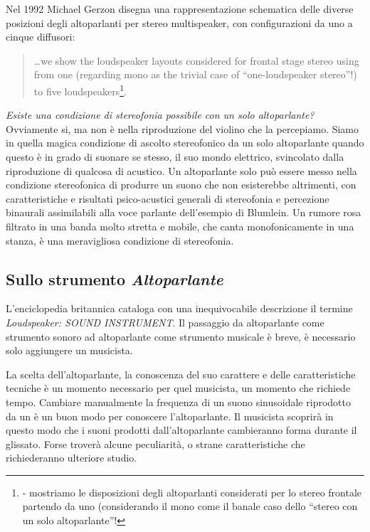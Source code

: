 Nel 1992 Michael Gerzon disegna una rappresentazione schematica delle diverse
posizioni degli altoparlanti per stereo multispeaker, con configurazioni da uno
a cinque diffusori:

\begin{quote}
\ldots we show the loudspeaker layouts considered for frontal stage stereo
using from one (regarding mono as the trivial case of “one-loudspeaker stereo”!)
to five loudspeakers\footnote{\cite{mg92pdmsss} - mostriamo le disposizioni
degli altoparlanti considerati per lo stereo frontale partendo da uno
(considerando il mono come il banale caso dello “stereo con un solo altoparlante”!}.
\end{quote}

\emph{Esiste una condizione di stereofonia possibile con un solo altoparlante?}
Ovviamente si, ma non è nella riproduzione del violino che la percepiamo. Siamo
in quella magica condizione di ascolto stereofonico da un solo altoparlante
quando questo è in grado di suonare se stesso, il suo mondo elettrico, svincolato
dalla riproduzione di qualcosa di acustico. Un altoparlante solo può essere
messo nella condizione stereofonica di produrre un suono che non esisterebbe
altrimenti, con caratteristiche e risultati psico-acustici generali di stereofonia
e percezione binaurali assimilabili alla voce parlante dell'esempio di Blumlein.
Un rumore rosa filtrato in una banda molto stretta e mobile, che canta
monofonicamente in una stanza, è una meravigliosa condizione di stereofonia.

\subsection{Sullo strumento \emph{Altoparlante}}

L'enciclopedia britannica cataloga con una inequivocabile descrizione il termine
\emph{Loudspeaker: SOUND INSTRUMENT}. Il passaggio da altoparlante come strumento
sonoro ad altoparlante come strumento musicale è breve, è necessario solo
aggiungere un musicista.

La scelta dell'altoparlante, la conoscenza del suo carattere e delle caratteristiche
tecniche è un momento necessario per quel musicista, un momento che richiede tempo.
Cambiare manualmente la frequenza di un suono sinusoidale riprodotto da un è un
buon modo per conoscere l'altoparlante. Il musicista scoprirà in questo modo che i
suoni prodotti dall'altoparlante cambieranno forma durante il glissato. Forse
troverà alcune peculiarità, o strane caratteristiche che richiederanno ulteriore
studio.

